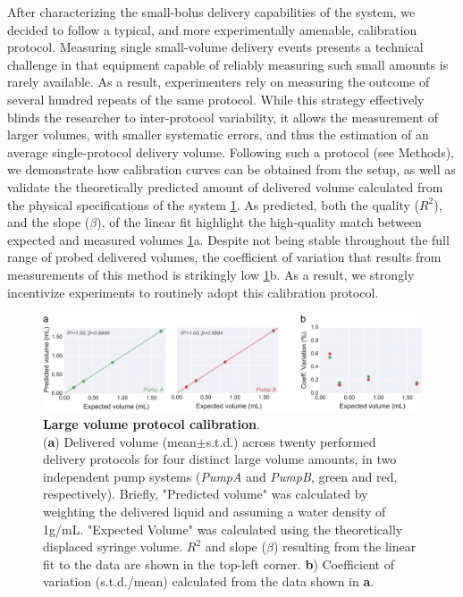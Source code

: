 After characterizing the small-bolus delivery capabilities of the system, we decided to follow a typical, and more experimentally amenable, calibration protocol. Measuring single small-volume delivery events presents a technical challenge in that equipment capable of reliably measuring such small amounts is rarely available. As a result, experimenters rely on measuring the outcome of several hundred repeats of the same protocol. While this strategy effectively blinds the researcher to inter-protocol variability, it allows the measurement of larger volumes, with smaller systematic errors, and thus the estimation of an average single-protocol delivery volume. Following such a protocol (see Methods), we demonstrate how calibration curves can be obtained from the setup, as well as validate the theoretically predicted amount of delivered volume calculated from the physical specifications of the system \ref{fig:LargeVolumeCalibration}. As predicted, both the quality  ($R^2$), and the slope ($\beta$), of the linear fit highlight the high-quality match between expected and measured volumes \ref{fig:LargeVolumeCalibration}a. Despite not being stable throughout the full range of probed delivered volumes, the coefficient of variation that results from measurements of this method is strikingly low \ref{fig:LargeVolumeCalibration}b. As a result, we strongly incentivize experiments to routinely adopt this calibration protocol.

\begin{figure}[ht] 
	\centering
	\includegraphics[width=1.0\linewidth]{Figures/Artboard 6.pdf}
	\caption{\textbf{Large volume protocol calibration}.\\
		(\textbf{a}) Delivered volume (mean$\pm$s.t.d.) across twenty performed delivery protocols for four distinct large volume amounts, in two independent pump systems (\textit{PumpA} and \textit{PumpB}, green and red, respectively). Briefly, "Predicted volume" was calculated by weighting the delivered liquid and assuming a water density of 1g/mL. "Expected Volume" was calculated using the theoretically displaced syringe volume.  $R^{2}$ and slope ($\beta$) resulting from the linear fit to the data are shown in the top-left corner. \textbf{b}) Coefficient of variation (s.t.d./mean) calculated from the data shown in \textbf{a}.}
	\label{fig:LargeVolumeCalibration} 
\end{figure}

